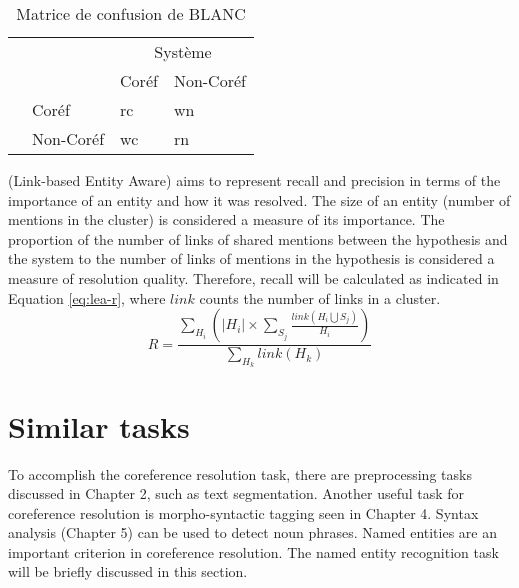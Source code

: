 \documentclass{KBook}
\begin{document}
\begin{table}[ht]
	\centering 
	\begin{tabular}{llll}
		\cline{3-4}\noalign{\vskip\doublerulesep
			\vskip-\arrayrulewidth}\cline{3-4}
		&& \multicolumn{2}{c}{Système} \\
		\cline{3-4}
	    && Coréf & Non-Coréf  \\
	    \cline{1-2}\noalign{\vskip\doublerulesep
	    	\vskip-\arrayrulewidth}\hline
	    
	\multirow{2}{*}{Hypothèse} & Coréf & rc & wn \\
	                       & Non-Coréf & wc & rn \\
	   \hline\hline
	\end{tabular}
	\caption[Matrice de confusion de BLANC]{Matrice de confusion de BLANC \cite{2011-recasens-hovy}}
	\label{tab:blanc-confusion}
\end{table}

 (Link-based Entity Aware) aims to represent recall and precision in terms of the importance of an entity and how it was resolved. The size of an entity (number of mentions in the cluster) is considered a measure of its importance. The proportion of the number of links of shared mentions between the hypothesis and the system to the number of links of mentions in the hypothesis is considered a measure of resolution quality. Therefore, recall will be calculated as indicated in Equation \ref{eq:lea-r}, where $link$ counts the number of links in a cluster.
\begin{equation}\label{eq:lea-r}
	R = \frac{\sum_{H_i} (|H_i| \times \sum_{S_j} \frac{link(H_i \bigcup S_j)}{H_i})}{\sum_{H_k} link(H_k)}
\end{equation}


\section{Similar tasks}

To accomplish the coreference resolution task, there are preprocessing tasks discussed in Chapter 2, such as text segmentation. Another useful task for coreference resolution is morpho-syntactic tagging seen in Chapter 4. Syntax analysis (Chapter 5) can be used to detect noun phrases. Named entities are an important criterion in coreference resolution. The named entity recognition task will be briefly discussed in this section.
\end{document}
